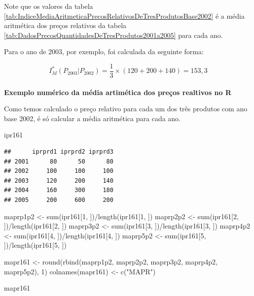 \documentclass[
]{book}
\newenvironment{Shaded}{\begin{snugshade}}{\end{snugshade}}
\newcommand{\DecValTok}[1]{\textcolor[rgb]{0.00,0.00,0.81}{#1}}
\newcommand{\FunctionTok}[1]{\textcolor[rgb]{0.00,0.00,0.00}{#1}}
\newcommand{\NormalTok}[1]{#1}
\newcommand{\OtherTok}[1]{\textcolor[rgb]{0.56,0.35,0.01}{#1}}
\newcommand{\SpecialCharTok}[1]{\textcolor[rgb]{0.00,0.00,0.00}{#1}}
\newcommand{\StringTok}[1]{\textcolor[rgb]{0.31,0.60,0.02}{#1}}
\begin{document}
Note que os valores da tabela \ref{tab:IndiceMediaAritmeticaPrecosRelativosDeTresProdutosBase2002} é a média aritmética dos preços relativos da tabela \ref{tab:DadosPrecosQuantidadesDeTresProdutos2001a2005} para cada ano.

Para o ano de 2003, por exemplo, foi calculada da seguinte forma:

\[
I_M^{*}(P_{2003}|P_{2002}) = \dfrac{1}{3}\times \left( 120 + 200 +140 \right) = 153,3
\]\\
\textbf{Exemplo numérico da média artimética dos preços realtivos no R}

Como temos calculado o preço relativo para cada um dos três produtos com ano
base 2002, é só calcular a média aritmética para cada ano.

\begin{Shaded}
\begin{Highlighting}[]
\NormalTok{ipr161}
\end{Highlighting}
\end{Shaded}

\begin{verbatim}
##      iprprd1 iprprd2 iprprd3
## 2001      80      50      80
## 2002     100     100     100
## 2003     120     200     140
## 2004     160     300     180
## 2005     200     600     200
\end{verbatim}

\begin{Shaded}
\begin{Highlighting}[]
\NormalTok{maprp1p2 }\OtherTok{\textless{}{-}} \FunctionTok{sum}\NormalTok{(ipr161[}\DecValTok{1}\NormalTok{, ])}\SpecialCharTok{/}\FunctionTok{length}\NormalTok{(ipr161[}\DecValTok{1}\NormalTok{, ])}
\NormalTok{maprp2p2 }\OtherTok{\textless{}{-}} \FunctionTok{sum}\NormalTok{(ipr161[}\DecValTok{2}\NormalTok{, ])}\SpecialCharTok{/}\FunctionTok{length}\NormalTok{(ipr161[}\DecValTok{2}\NormalTok{, ])}
\NormalTok{maprp3p2 }\OtherTok{\textless{}{-}} \FunctionTok{sum}\NormalTok{(ipr161[}\DecValTok{3}\NormalTok{, ])}\SpecialCharTok{/}\FunctionTok{length}\NormalTok{(ipr161[}\DecValTok{3}\NormalTok{, ])}
\NormalTok{maprp4p2 }\OtherTok{\textless{}{-}} \FunctionTok{sum}\NormalTok{(ipr161[}\DecValTok{4}\NormalTok{, ])}\SpecialCharTok{/}\FunctionTok{length}\NormalTok{(ipr161[}\DecValTok{4}\NormalTok{, ])}
\NormalTok{maprp5p2 }\OtherTok{\textless{}{-}} \FunctionTok{sum}\NormalTok{(ipr161[}\DecValTok{5}\NormalTok{, ])}\SpecialCharTok{/}\FunctionTok{length}\NormalTok{(ipr161[}\DecValTok{5}\NormalTok{, ])}

\NormalTok{mapr161 }\OtherTok{\textless{}{-}} \FunctionTok{round}\NormalTok{(}\FunctionTok{rbind}\NormalTok{(maprp1p2, maprp2p2, maprp3p2, }
\NormalTok{    maprp4p2, maprp5p2), }\DecValTok{1}\NormalTok{)}
\FunctionTok{colnames}\NormalTok{(mapr161) }\OtherTok{\textless{}{-}} \FunctionTok{c}\NormalTok{(}\StringTok{"MAPR"}\NormalTok{)}

\NormalTok{mapr161}
\end{Highlighting}
\end{Shaded}
\end{document}
